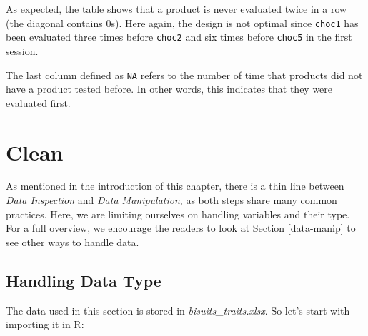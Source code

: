 \documentclass[
]{krantz}
\renewenvironment{quote}{\begin{VF}}{\end{VF}}
\begin{document}
As expected, the table shows that a product is never evaluated twice in a row (the diagonal contains 0s). Here again, the design is not optimal since \texttt{choc1} has been evaluated three times before \texttt{choc2} and six times before \texttt{choc5} in the first session.

\begin{quote}
The last column defined as \texttt{NA} refers to the number of time that products did not have a product tested before. In other words, this indicates that they were evaluated first.
\end{quote}

\hypertarget{clean}{%
\section{Clean}\label{clean}}

As mentioned in the introduction of this chapter, there is a thin line between \emph{Data Inspection} and \emph{Data Manipulation}, as both steps share many common practices. Here, we are limiting ourselves on handling variables and their type. For a full overview, we encourage the readers to look at Section \ref{data-manip} to see other ways to handle data.

\hypertarget{handling-data-type}{%
\subsection{Handling Data Type}\label{handling-data-type}}

The data used in this section is stored in \emph{bisuits\_traits.xlsx}. So let's start with importing it in R:
\end{document}
